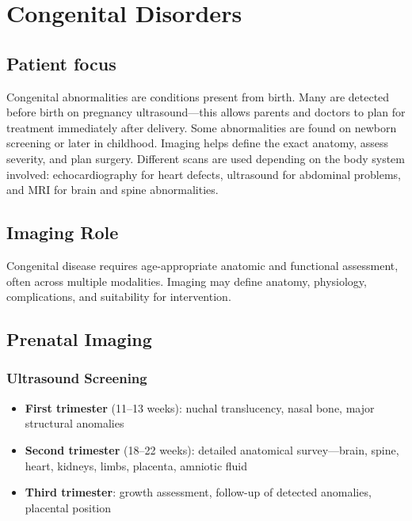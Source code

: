\chapter{Congenital Disorders}

\section*{Patient focus}
Congenital abnormalities are conditions present from birth. Many are detected before birth on pregnancy ultrasound---this allows parents and doctors to plan for treatment immediately after delivery. Some abnormalities are found on newborn screening or later in childhood. Imaging helps define the exact anatomy, assess severity, and plan surgery. Different scans are used depending on the body system involved: echocardiography for heart defects, ultrasound for abdominal problems, and MRI for brain and spine abnormalities.


\label{ch:ch68_congenital}

\section{Imaging Role}
Congenital disease requires age-appropriate anatomic and functional assessment, often across multiple modalities. Imaging may define anatomy, physiology, complications, and suitability for intervention.

\section{Prenatal Imaging}

\subsection{Ultrasound Screening}
\begin{itemize}
  \item \textbf{First trimester} (11--13 weeks): nuchal translucency, nasal bone, major structural anomalies
  \item \textbf{Second trimester} (18--22 weeks): detailed anatomical survey---brain, spine, heart, kidneys, limbs, placenta, amniotic fluid
  \item \textbf{Third trimester}: growth assessment, follow-up of detected anomalies, placental position
\end{itemize}

